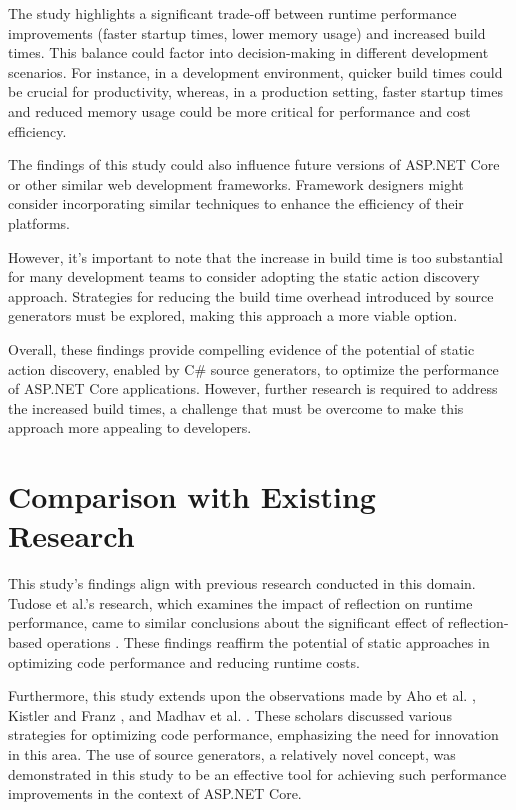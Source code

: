 The study highlights a significant trade-off between runtime performance improvements (faster startup times, lower memory usage) and increased build times. This balance could factor into decision-making in different development scenarios. For instance, in a development environment, quicker build times could be crucial for productivity, whereas, in a production setting, faster startup times and reduced memory usage could be more critical for performance and cost efficiency.

The findings of this study could also influence future versions of ASP.NET Core or other similar web development frameworks. Framework designers might consider incorporating similar techniques to enhance the efficiency of their platforms.

However, it's important to note that the increase in build time is too substantial for many development teams to consider adopting the static action discovery approach. Strategies for reducing the build time overhead introduced by source generators must be explored, making this approach a more viable option.

Overall, these findings provide compelling evidence of the potential of static action discovery, enabled by C\# source generators, to optimize the performance of ASP.NET Core applications. However, further research is required to address the increased build times, a challenge that must be overcome to make this approach more appealing to developers.


\section{Comparison with Existing Research}

This study's findings align with previous research conducted in this domain. Tudose et al.'s research, which examines the impact of reflection on runtime performance, came to similar conclusions about the significant effect of reflection-based operations \cite{Tudose2013}. These findings reaffirm the potential of static approaches in optimizing code performance and reducing runtime costs.

Furthermore, this study extends upon the observations made by Aho et al. \cite{Aho2007}, Kistler and Franz \cite{Kistler2003}, and Madhav et al. 
\cite{Shreyas2021}. These scholars discussed various strategies for optimizing code performance, emphasizing the need for innovation in this area. The use of source generators, a relatively novel concept, was demonstrated in this study to be an effective tool for achieving such performance improvements in the context of ASP.NET Core.

